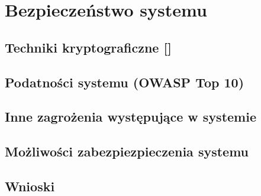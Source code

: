 \newpage\section{Bezpieczeństwo systemu \textsl{\NazwaSys}} \label{sec:bezpieczenstwo}
\subsection[Techniki kryptograficzne]{Techniki kryptograficzne [\StudentB]}

\newpage
\subsection[Podatności systemu (OWASP Top 10)]{Podatności systemu (OWASP Top 10) \newline [\StudentA]}

\newpage
\subsection[Inne zagrożenia występujące w systemie]{Inne zagrożenia występujące w systemie \newline [\StudentB]}

\newpage
\subsection[Możliwości zabezpiezpieczenia systemu]{Możliwości zabezpiezpieczenia systemu \newline [\StudentA]}

\newpage
\subsection{Wnioski}
 
